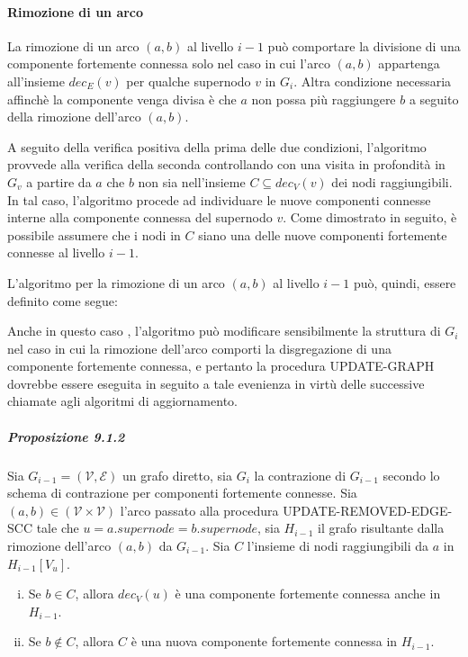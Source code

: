 \paragraph{Rimozione di un arco}
La rimozione di un arco $(a, b)$ al livello $i-1$ pu\`o comportare la divisione di una componente fortemente connessa
solo nel caso in cui l'arco $(a, b)$ appartenga all'insieme $dec_E(v)$ per qualche supernodo $v$ in $G_i$.
Altra condizione necessaria affinch\`e la componente venga divisa \`e che $a$ non possa pi\`u raggiungere $b$ a
seguito della rimozione dell'arco $(a, b)$. \newline

A seguito della verifica positiva della prima delle due condizioni, l'algoritmo provvede alla verifica della seconda
controllando con una visita in profondit\`a in $G_v$ a partire da $a$ che $b$ non sia nell'insieme $C \subseteq dec_V(v)$
dei nodi raggiungibili.
In tal caso, l'algoritmo procede ad individuare le nuove componenti connesse interne alla componente connessa del
supernodo $v$.
Come dimostrato in seguito, \`e possibile assumere che i nodi in $C$ siano una delle nuove componenti fortemente
connesse al livello $i-1$.

L'algoritmo per la rimozione di un arco $(a, b)$ al livello $i-1$ pu\`o, quindi, essere definito come segue:



Anche in questo caso , l'algoritmo pu\`o modificare sensibilmente la struttura di $G_i$ nel caso in cui la rimozione
dell'arco comporti la disgregazione di una componente fortemente connessa, e pertanto la procedura UPDATE-GRAPH
dovrebbe essere eseguita in seguito a tale evenienza in virt\`u delle successive chiamate agli algoritmi di
aggiornamento.

\subparagraph{Proposizione 9.1.2}
Sia $G_{i-1} = (\mathcal{V}, \mathcal{E})$ un grafo diretto, sia $G_i$ la contrazione di $G_{i-1}$ secondo
lo schema di contrazione per componenti fortemente connesse.
Sia $(a, b) \in (\mathcal{V} \times \mathcal{V})$ l'arco passato alla procedura UPDATE-REMOVED-EDGE-SCC tale che
$u = a.supernode = b.supernode$, sia $H_{i-1}$ il grafo risultante dalla rimozione dell'arco $(a, b)$ da $G_{i-1}$.
Sia $C$ l'insieme di nodi raggiungibili da $a$ in $H_{i-1}[V_u]$.

\begin{enumerate}[(i)]
    \item Se $b \in C$, allora $dec_V(u)$ \`e una componente fortemente connessa anche in $H_{i-1}$.
    \item Se $b \notin C$, allora $C$ \`e una nuova componente fortemente connessa in $H_{i-1}$.
\end{enumerate}


